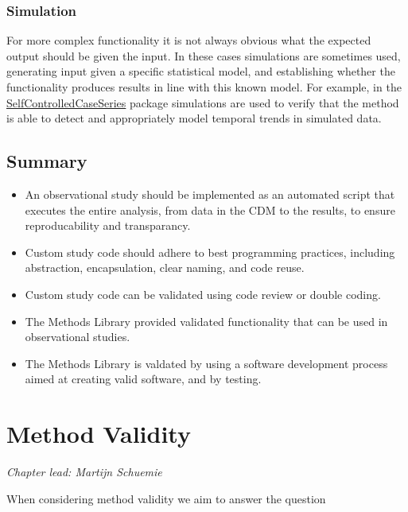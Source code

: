 \documentclass[11pt]{book}
\theoremstyle{definition}
\theoremstyle{definition}
\theoremstyle{definition}
\theoremstyle{remark}
\let\BeginKnitrBlock\begin \let\EndKnitrBlock\end
\begin{document}
\hypertarget{simulation}{%
\subsection{Simulation}\label{simulation}}

For more complex functionality it is not always obvious what the expected output should be given the input. In these cases simulations are sometimes used, generating input given a specific statistical model, and establishing whether the functionality produces results in line with this known model. For example, in the \href{https://ohdsi.github.io/SelfControlledCaseSeries/}{SelfControlledCaseSeries} package simulations are used to verify that the method is able to detect and appropriately model temporal trends in simulated data.

\hypertarget{summary-6}{%
\section{Summary}\label{summary-6}}

\BeginKnitrBlock{rmdsummary}
\begin{itemize}
\item
  An observational study should be implemented as an automated script that executes the entire analysis, from data in the CDM to the results, to ensure reproducability and transparancy.
\item
  Custom study code should adhere to best programming practices, including abstraction, encapsulation, clear naming, and code reuse.
\item
  Custom study code can be validated using code review or double coding.
\item
  The Methods Library provided validated functionality that can be used in observational studies.
\item
  The Methods Library is valdated by using a software development process aimed at creating valid software, and by testing.
\end{itemize}
\EndKnitrBlock{rmdsummary}

\hypertarget{MethodValidity}{%
\chapter{Method Validity}\label{MethodValidity}}

\emph{Chapter lead: Martijn Schuemie}

When considering method validity we aim to answer the question
\end{document}
